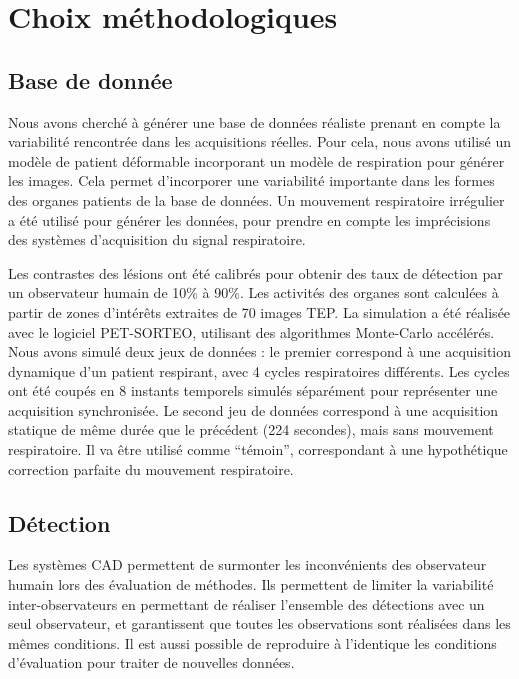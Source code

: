 \chapter{Choix méthodologiques}


\section{Base de donnée}

Nous avons cherché à générer une base de données réaliste prenant en compte la variabilité rencontrée dans les acquisitions réelles. Pour cela, nous avons utilisé un modèle de patient déformable incorporant un modèle de respiration pour générer les images. Cela permet d'incorporer une variabilité importante dans les formes des organes patients de la base de données. Un mouvement respiratoire irrégulier a été utilisé pour générer les données, pour prendre en compte les imprécisions des systèmes d'acquisition du signal respiratoire. 


Les contrastes des lésions ont été calibrés pour obtenir des taux de détection par un observateur humain de 10\% à 90\%. Les activités des organes sont calculées à partir de zones d'intérêts extraites de 70 images TEP. La simulation a été réalisée avec le logiciel PET-SORTEO, utilisant des algorithmes Monte-Carlo accélérés. Nous avons simulé deux jeux de données : le premier correspond à une acquisition dynamique d'un patient respirant, avec 4 cycles respiratoires différents. Les cycles ont été coupés en 8 instants temporels simulés séparément pour représenter une acquisition synchronisée. Le second jeu de données correspond à une acquisition statique de même durée que le précédent (224 secondes), mais sans mouvement respiratoire. Il va être utilisé comme ``témoin'', correspondant à une hypothétique correction parfaite du mouvement respiratoire.


\section{Détection}

Les systèmes CAD permettent de surmonter les inconvénients des observateur humain lors des évaluation de méthodes. Ils permettent de limiter la variabilité inter-observateurs en permettant de réaliser l'ensemble des détections avec un seul observateur, et garantissent que toutes les observations sont réalisées dans les mêmes conditions. Il est aussi possible de reproduire à l'identique les conditions d'évaluation pour traiter de nouvelles données.

